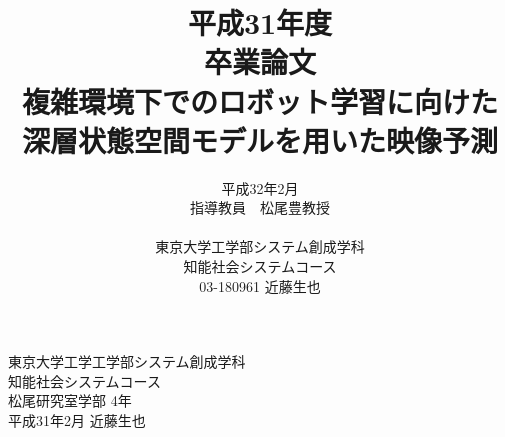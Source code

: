\documentclass[a4paper,12pt,oneside,openany,dvipdfmx]{jsbook}
\title{
    平成31年度\\
    卒業論文\\
    複雑環境下でのロボット学習に向けた\\
    深層状態空間モデルを用いた映像予測
}
\author{
    平成32年2月\\
    指導教員　松尾豊教授\\
    \\
    東京大学工学部システム創成学科\\
    知能社会システムコース\\
    03-180961 近藤生也
}
\date{}
\begin{document}
\maketitle
\pagestyle{plain}
\setlength{\baselineskip}{22truept}
\frontmatter

\setcounter{tocdepth}{2}
\tableofcontents
\listoffigures
\listoftables
\mainmatter

% 
% 
% 
% 
% 
% 
% 

\begin{flushright}
東京大学工学工学部システム創成学科\\
知能社会システムコース\\
松尾研究室学部 4年\\
平成31年2月 近藤生也\\
\end{flushright}

\end{document}
